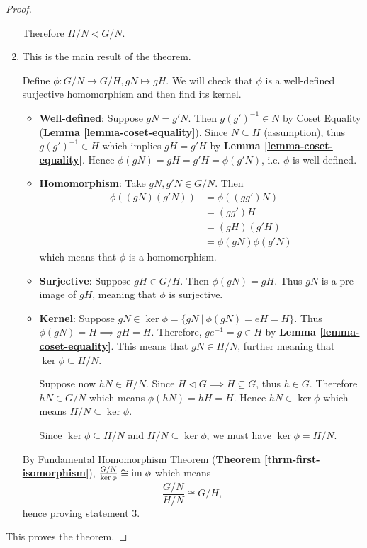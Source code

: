 \begin{proof}
\begin{enumerate}
        Therefore $H/N \lhd G/N$.

        \item This is the main result of the theorem.

        Define $\phi: G/N \to G/H, gN \mapsto gH$. We will check that $\phi$ is a well-defined surjective homomorphism and then find its kernel.
        \begin{itemize}
            \item \textbf{Well-defined}: Suppose $gN = g'N$. Then $g(g')^{-1} \in N$ by Coset Equality (\textbf{Lemma \ref{lemma-coset-equality}}). Since $N \subseteq H$ (assumption), thus $g(g')^{-1} \in H$ which implies $gH = g'H$ by \textbf{Lemma \ref{lemma-coset-equality}}. Hence $\phi(gN) = gH = g'H = \phi(g'N)$, i.e. $\phi$ is well-defined.
            \item \textbf{Homomorphism}: Take $gN, g'N \in G/N$. Then
            \begin{align*}
                \phi((gN)(g'N)) &= \phi((gg')N)\\
                &= (gg')H\\
                &= (gH)(g'H)\\
                &= \phi(gN)\phi(g'N)
            \end{align*}
            which means that $\phi$ is a homomorphism.
            
            \item \textbf{Surjective}: Suppose $gH \in G/H$. Then $\phi(gN) = gH$. Thus $gN$ is a pre-image of $gH$, meaning that $\phi$ is surjective.
            
            \item \textbf{Kernel}: Suppose $gN \in \ker\phi = \{gN \ | \ \phi(gN) = eH = H\}$. Thus $\phi(gN) = H \implies gH = H$. Therefore, $ge^{-1} = g \in H$ by \textbf{Lemma \ref{lemma-coset-equality}}. This means that $gN \in H/N$, further meaning that $\ker\phi \subseteq H/N$.

            Suppose now $hN \in H/N$. Since $H \lhd G \implies H\subseteq G$, thus $h \in G$. Therefore $hN \in G/N$ which means $\phi(hN) = hH = H$. Hence $hN \in \ker\phi$ which means $H/N \subseteq \ker\phi$.

            Since $\ker\phi \subseteq H/N$ and $H/N \subseteq \ker\phi$, we must have $\ker\phi = H/N$.
        \end{itemize}

        By Fundamental Homomorphism Theorem (\textbf{Theorem \ref{thrm-first-isomorphism}}), $\frac{G/N}{\ker\phi} \cong \mathrm{im}\;\phi$ which means
        \[
            \frac{G/N}{H/N} \cong G/H,
        \]
        hence proving statement 3.
    \end{enumerate}
    This proves the theorem.
\end{proof}

